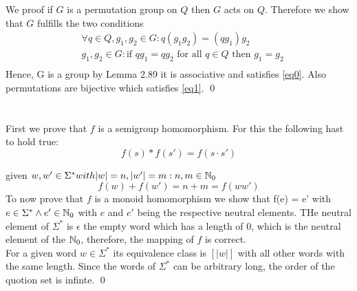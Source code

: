 \documentclass[a4paper,12pt,numbers=noenddot]{scrreport}
\begin{document}
\section{}
We proof if $G$ is a permutation group on $Q$ then $G$ acts on $Q$.
Therefore we show that $G$ fulfills the two conditions
\begin{align*}
    & \forall q \in Q, g_1,g_2 \in G: q(g_1g_2) = (qg_1)g_2 \label{eq0}\tag{1} \\
    & g_1,g_2 \in G: \text{if } qg_1 = qg_2 \text{ for all } q \in Q \text{ then } g_1 = g_2 \label{eq1}\tag{2} \\
\end{align*}
Hence, G is a group by Lemma 2.89 it is associative and satisfies \eqref{eq0}.
Also permutations are bijective which satisfies \eqref{eq1}.
\qed

\section{}

First we prove that $f$ is a semigroup homomorphism. For this the following hast to hold true:
\begin{equation}
    f(s) * f(s') = f(s \cdot s')
\end{equation}

given $w, w' \in \Sigma ^* with |w| = n, |w'| = m : n,m \in \mathbb{N\textsubscript{0}}$
\begin{equation}
    f(w)+f(w') = n+m = f(ww')
\end{equation}
To now prove that $f$ is a monoid homomorphism we show that f(e) = e' with $e \in \Sigma ^* \land e' \in \mathbb{N\textsubscript{0}}$ with $e$ and $e'$ being the respective neutral elements. THe neutral element of $\Sigma ^*$ is $\epsilon$ the empty word which has a length of $0$, which is the neutral element of the $\mathbb{N\textsubscript{0}}$, therefore, the mapping of $f$ is correct.\\

For a given word $w \in \Sigma ^*$ its equivalence class is $[|w|]$ with all other words with the same length.
Since the words of $\Sigma ^*$ can be arbitrary long, the order of the quotion set is infinte.
\qed
\end{document}
